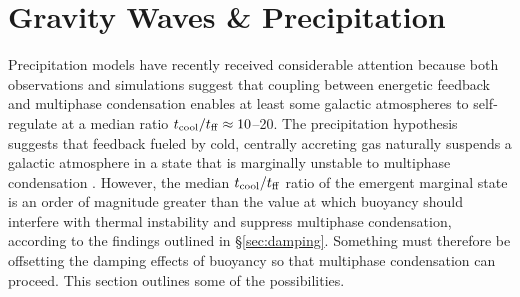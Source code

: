 \documentclass[twocolumn]{aastex63}
\begin{document}
\section{Gravity Waves \& Precipitation}
\label{sec:blob_orbits}

Precipitation models have recently received considerable attention because both  observations \citep{Voit_2015Natur.519..203V,Voit+2015ApJ...803L..21V,Voit_2018ApJ...853...78V,Voit_2019ApJ...879L...1V,Voit_2019ApJ...880..139V,Hogan_2017_tctff,Pulido_2018ApJ...853..177P,Babyk_2018ApJ...862...39B} and simulations \citep{McCourt+2012MNRAS.419.3319M,Sharma_2012MNRAS.420.3174S,Gaspari+2012ApJ...746...94G,Gaspari+2013MNRAS.432.3401G,Li_2015ApJ...811...73L,Prasad_2015ApJ...811..108P,Prasad_2018ApJ...863...62P,YangReynolds_2016ApJ...818..181Y,Meece_2017ApJ...841..133M,Fielding_2017MNRAS.466.3810F,Esmerian_2020arXiv200613945E} suggest that coupling between energetic feedback and multiphase condensation enables at least some galactic atmospheres to self-regulate at a median ratio $t_{\rm cool} / t_{\rm ff} \approx 10$--20.  The precipitation hypothesis suggests that feedback fueled by cold, centrally accreting gas naturally suspends a galactic atmosphere in a state that is marginally unstable to multiphase condensation \citep[e.g.,][]{TaborBinney1993MNRAS.263..323T,BinneyTabor_1995MNRAS.276..663B,MallerBullock_2004MNRAS.355..694M,ps05,ps10,McCourt+2012MNRAS.419.3319M,Sharma_2012MNRAS.420.3174S,Gaspari+2012ApJ...746...94G,Gaspari_2017MNRAS.466..677G,Soker_2016NewAR..75....1S,Voit_2017_BigPaper}. However, the median $t_{\rm cool} / t_{\rm ff}$ ratio of the emergent marginal state is an order of magnitude greater than the value at which buoyancy should interfere with thermal instability and suppress multiphase condensation, according to the findings outlined in \S \ref{sec:damping}.  Something must therefore be offsetting the damping effects of buoyancy so that multiphase condensation can proceed.  This section outlines some of the possibilities.
\end{document}
